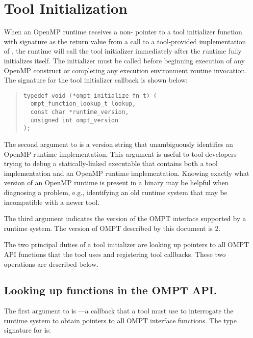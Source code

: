 \section{Tool Initialization}
\label{sec:ToolsSupport_init}

When an OpenMP runtime receives a non- pointer to a tool initializer function with signature  as the return value from a call to a tool-provided implementation of , the runtime will call the tool initializer immediately after the runtime fully initializes itself.
The initializer must be called before beginning execution of any OpenMP construct or completing any execution environment routine invocation.
The signature for the tool initializer callback is shown below:

\begin{quote}
\begin{verbatim}
typedef void (*ompt_initialize_fn_t) (
  ompt_function_lookup_t lookup,
  const char *runtime_version, 
  unsigned int ompt_version
);
\end{verbatim}
\end{quote}

The second argument to  is a version string that unambiguously identifies an OpenMP runtime implementation.
This argument is useful to tool developers trying to debug a statically-linked executable that contains both a tool implementation and an OpenMP runtime implementation.
Knowing exactly what version of an OpenMP runtime is present in a binary may be helpful when diagnosing a problem, e.g., identifying an old runtime system that may be incompatible with a newer tool.

The third argument  indicates the version of the OMPT interface supported by a runtime system.
The version of OMPT described by this document is 2.

The two principal duties of a tool initializer are looking up pointers to all OMPT API functions that the tool uses and registering tool callbacks.
These two operations are described below.

\subsection{Looking up functions in the OMPT API.}
The first argument to  is ---a callback that a tool must use to interrogate the runtime system to obtain pointers to all OMPT interface functions.
The type signature for  is:


